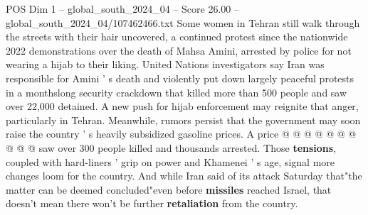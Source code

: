 \begin{textsample}{POS Dim 1 – global\_south\_2024\_04 – Score 26.00 – global\_south\_2024\_04/107462466.txt}
Some women in Tehran still walk through the streets with their hair uncovered, a continued protest since the nationwide 2022 demonstrations over the death of Mahsa Amini, arrested by police for not wearing a hijab to their liking.
United Nations investigators say Iran was responsible for Amini ' s death and violently put down largely peaceful protests in a monthslong security crackdown that killed more than 500 people and saw over 22,000 detained.
A new push for hijab enforcement may reignite that anger, particularly in Tehran.
Meanwhile, rumors persist that the government may soon raise the country ' s heavily subsidized gasoline prices.
A price @ @ @ @ @ @ @ @ @ @ saw over 300 people killed and thousands arrested.
Those \textbf{tensions}, coupled with hard-liners ' grip on power and Khamenei ' s age, signal more changes loom for the country.
And while Iran said of its attack Saturday that"the matter can be deemed concluded"even before \textbf{missiles} reached Israel, that doesn't mean there won't be further \textbf{retaliation} from the country.

\end{textsample}
